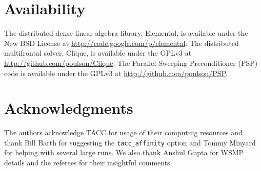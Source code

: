 %

\section*{Availability} The distributed dense linear algebra library, Elemental,
is available under the New BSD License at 
\url{http://code.google.com/p/elemental}. The distributed multifrontal solver, 
Clique, is available under the GPLv3 at 
\url{http://github.com/poulson/Clique}. The Parallel Sweeping 
Preconditioner (PSP) code is available under the GPLv3 at
\url{http://github.com/poulson/PSP}.

\section*{Acknowledgments}
The authors acknowledge TACC for usage of their computing resources and 
thank Bill Barth for suggesting the \verb!tacc_affinity! option and Tommy 
Minyard for helping with several large runs. We also thank Anshul Gupta for 
WSMP details and the referees for their insightful comments.
 
